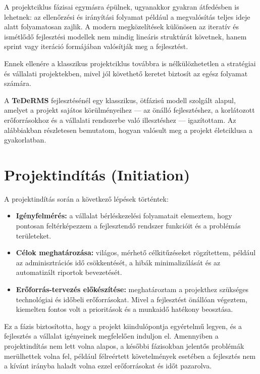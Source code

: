 A projektciklus fázisai egymásra épülnek, ugyanakkor gyakran átfedésben is lehetnek: 
az ellenőrzési és irányítási folyamat például a megvalósítás teljes ideje alatt folyamatosan zajlik.  
A modern megközelítések különösen az iteratív és ismétlődő fejlesztési modellek nem mindig lineáris struktúrát követnek, 
hanem sprint vagy iteráció formájában valósítják meg a fejlesztést.  

Ennek ellenére a klasszikus projektciklus továbbra is nélkülözhetetlen a stratégiai és vállalati projektekben, 
mivel jól követhető keretet biztosít az egész folyamat számára.  

A \textbf{TeDeRMS} fejlesztésénél egy klasszikus, ötfázisú modell szolgált alapul, 
amelyet a projekt sajátos körülményeihez — az önálló fejlesztéshez, a korlátozott erőforrásokhoz és a vállalati rendszerbe való illesztéshez — igazítottam.
Az alábbiakban részletesen bemutatom, hogyan valósult meg a projekt életciklusa a gyakorlatban.


\section{Projektindítás (Initiation)}

A projektindítás során a következő lépések történtek:
\begin{itemize}
    \item \textbf{Igényfelmérés:} a vállalat bérléskezelési folyamatait elemeztem, hogy pontosan feltérképezzem a fejlesztendő rendszer funkcióit és a problémás területeket.
    \item \textbf{Célok meghatározása:} világos, mérhető célkitűzéseket rögzítettem, például az adminisztrációs idő csökkentését, a hibák minimalizálását és az automatizált riportok bevezetését.
    \item \textbf{Erőforrás-tervezés előkészítése:} meghatároztam a projekthez szükséges technológiai és időbeli erőforrásokat. 
    Mivel a fejlesztést önállóan végeztem, kiemelten fontos volt a prioritások és a munkaidő hatékony beosztása.
\end{itemize}

Ez a fázis biztosította, hogy a projekt kiindulópontja egyértelmű legyen, és a fejlesztés a vállalat igényeinek megfelelően induljon el.
Amennyiben a projektindítás nem lett volna alapos, a későbbi fázisokban jelentős problémák merülhettek volna fel, 
például félreértett követelmények esetében a fejlesztés nem a kívánt irányba haladt volna ezzel erőforrásokat és időt pazarolva.


